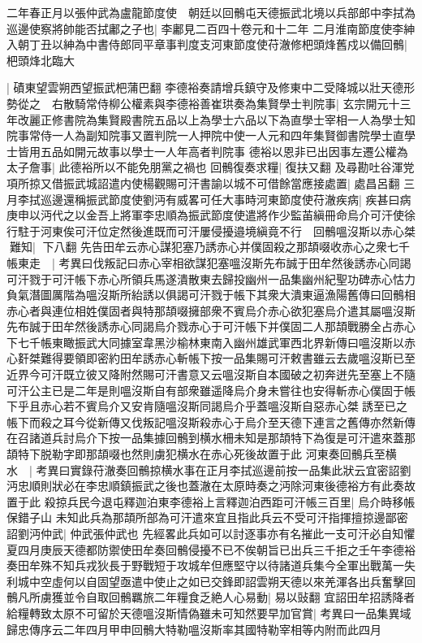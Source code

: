 二年春正月以張仲武為盧龍節度使　朝廷以回鶻屯天德振武北境以兵部郎中李拭為巡邊使察將帥能否拭鄘之子也|{
	李鄘見二百四十卷元和十二年}
二月淮南節度使李紳入朝丁丑以紳為中書侍郎同平章事判度支河東節度使苻澈修杷頭烽舊戍以備回鶻|{
	杷頭烽北臨大}


|{
	磧東望雲朔西望振武杷蒲巴翻}
李德裕奏請增兵鎮守及修東中二受降城以壯天德形勢從之　右散騎常侍柳公權素與李德裕善崔珙奏為集賢學士判院事|{
	玄宗開元十三年改麗正修書院為集賢殿書院五品以上為學士六品以下為直學士宰相一人為學士知院事常侍一人為副知院事又置判院一人押院中使一人元和四年集賢御書院學士直學士皆用五品如開元故事以學士一人年高者判院事}
德裕以恩非已出因事左遷公權為太子詹事|{
	此德裕所以不能免朋黨之禍也}
回鶻復奏求糧|{
	復扶又翻}
及尋勘吐谷渾党項所掠又借振武城詔遣内使楊觀賜可汗書諭以城不可借餘當應接處置|{
	處昌呂翻}
三月李拭巡邊還稱振武節度使劉沔有威畧可任大事時河東節度使苻澈疾病|{
	疾甚曰病}
庚申以沔代之以金吾上將軍李忠順為振武節度使遣將作少監苖縝冊命烏介可汗使徐行駐于河東俟可汗位定然後進既而可汗屢侵擾邉境縝竟不行　回鶻嗢沒斯以赤心桀難知|{
	下八翻}
先告田牟云赤心謀犯塞乃誘赤心并僕固殺之那頡啜收赤心之衆七千帳東走　|{
	考異曰伐叛記曰赤心宰相欲謀犯塞嗢沒斯先布誠于田牟然後誘赤心同謁可汗戮于可汗帳下赤心所領兵馬遂潰散東去歸投幽州一品集幽州紀聖功碑赤心怙力負氣潛圖厲階為嗢沒斯所紿誘以俱謁可汗戮于帳下其衆大潰東逼漁陽舊傳曰回鶻相赤心者與連位相姓僕固者與特那頡啜擁部衆不賓烏介赤心欲犯塞烏介遣其屬嗢沒斯先布誠于田牟然後誘赤心同謁烏介戮赤心于可汗帳下并僕固二人那頡戰勝全占赤心下七千帳東瞰振武大同據室韋黑沙榆林東南入幽州雄武軍西北界新傳曰嗢沒斯以赤心姧桀難得要領即密約田牟誘赤心斬帳下按一品集賜可汗敕書雖云去歲嗢沒斯已至近界今可汗既立彼又降附然賜可汗書意又云嗢沒斯自本國破之初奔迸先至塞上不隨可汗公主已是二年是則嗢沒斯自有部衆雖遥降烏介身未嘗往也安得斬赤心僕固于帳下乎且赤心若不賓烏介又安肯隨嗢沒斯同謁烏介乎蓋嗢沒斯自惡赤心桀誘至已之帳下而殺之耳今從新傳又伐叛記嗢沒斯殺赤心于烏介至天德下連言之舊傳亦然新傳在召諸道兵討烏介下按一品集據回鶻到横水柵未知是那頡特下為復是可汗遣來蓋那頡特下脱勒字即那頡啜也然則虜犯横水在赤心死後故置于此}
河東奏回鶻兵至横水　|{
	考異曰實錄苻澈奏回鶻掠横水事在正月李拭巡邊前按一品集此狀云宜密詔劉沔忠順則狀必在李忠順鎮振武之後也蓋澈在太原時奏之沔除河東後德裕方有此奏故置于此}
殺掠兵民今退屯釋迦泊東李德裕上言釋迦泊西距可汗帳三百里|{
	烏介時移帳保錯子山}
未知此兵為那頡所部為可汗遣來宜且指此兵云不受可汗指揮擅掠邊鄙密詔劉沔仲武|{
	仲武張仲武也}
先經畧此兵如可以討逐事亦有名摧此一支可汗必自知懼夏四月庚辰天德都防禦使田牟奏回鶻侵擾不已不俟朝旨已出兵三千拒之壬午李德裕奏田牟殊不知兵戎狄長于野戰短于攻城牟但應堅守以待諸道兵集今全軍出戰萬一失利城中空虛何以自固望亟遣中使止之如已交鋒即詔雲朔天德以來羌渾各出兵奮擊回鶻凡所虜獲並令自取回鶻羈旅二年糧食乏絶人心易動|{
	易以䜴翻}
宜詔田牟招誘降者給糧轉致太原不可留於天德嗢沒斯情偽雖未可知然要早加官賞|{
	考異曰一品集異域歸忠傳序云二年四月甲申回鶻大特勒嗢沒斯率其國特勒宰相等内附而此四月}


